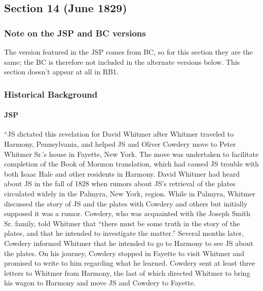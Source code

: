 \subsection{Section 14 (June 1829)}
	\label{DC14}
	
	\subsubsection{Note on the JSP and BC versions}
	
		The version featured in the JSP comes from BC, so for this section they are the same; the BC is therefore not included in the alternate versions below. This section doesn't appear at all in RB1.
	
	\subsubsection{Historical Background}
		\label{DC14-HB}
		
		\paragraph{JSP}
		
			``JS dictated this revelation for David Whitmer after Whitmer traveled to Harmony, Pennsylvania, and helped JS and Oliver Cowdery move to Peter Whitmer Sr.'s house in Fayette, New York. The move was undertaken to facilitate completion of the Book of Mormon translation, which had caused JS trouble with both Isaac Hale and other residents in Harmony. David Whitmer had heard about JS in the fall of 1828 when rumors about JS's retrieval of the plates circulated widely in the Palmyra, New York, region. While in Palmyra, Whitmer discussed the story of JS and the plates with Cowdery and others but initially supposed it was a rumor. Cowdery, who was acquainted with the Joseph Smith Sr. family, told Whitmer that ``there must be some truth in the story of the plates, and that he intended to investigate the matter.'' Several months later, Cowdery informed Whitmer that he intended to go to Harmony to see JS about the plates. On his journey, Cowdery stopped in Fayette to visit Whitmer and promised to write to him regarding what he learned. Cowdery sent at least three letters to Whitmer from Harmony, the last of which directed Whitmer to bring his wagon to Harmony and move JS and Cowdery to Fayette.
			
